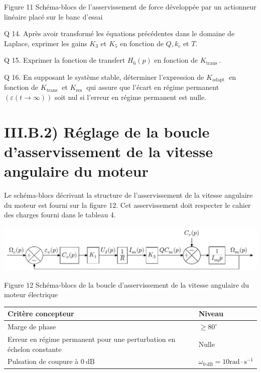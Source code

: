 \documentclass[10pt]{article}
\begin{document}
Figure 11 Schéma-blocs de l'asservissement de force développée par un actionneur linéaire placé sur le banc d'essai

Q 14. Après avoir transformé les équations précédentes dans le domaine de Laplace, exprimer les gains $K_{3}$ et $K_{5}$ en fonction de $Q, k_{c}$ et $T$.

Q 15. Exprimer la fonction de transfert $H_{6}(p)$ en fonction de $K_{\text {trans }}$.

Q 16. En supposant le système stable, déterminer l'expression de $K_{\text {adapt }}$ en fonction de $K_{\text {trans }}$ et $K_{\text {res }}$ qui assure que l'écart en régime permanent $(\varepsilon(t \rightarrow \infty))$ soit nul si l'erreur en régime permanent est nulle.

\section*{III.B.2) Réglage de la boucle d'asservissement de la vitesse angulaire du moteur}
Le schéma-blocs décrivant la structure de l'asservissement de la vitesse angulaire du moteur est fourni sur la figure 12. Cet asservissement doit respecter le cahier des charges fourni dans le tableau 4.

\begin{center}
\includegraphics[max width=\textwidth]{2024_03_20_0c3cf888f6e04b1986bcg-10}
\end{center}

Figure 12 Schéma-blocs de la boucle d'asservissement de la vitesse angulaire du moteur électrique

\begin{center}
\begin{tabular}{|l|l|}
\hline
Critère concepteur & Niveau \\
\hline
Marge de phase & $\geqslant 80^{\circ}$ \\
\hline
Erreur en régime permanent pour une perturbation en échelon constante & Nulle \\
\hline
Pulsation de coupure à $0 \mathrm{~dB}$ & $\omega_{0 \mathrm{~dB}}=10 \mathrm{rad} \cdot \mathrm{s}^{-1}$ \\
\hline
\end{tabular}
\end{center}
\end{document}
